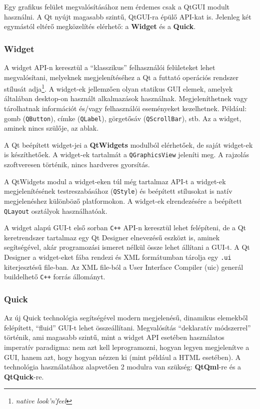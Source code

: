 \documentclass[12pt]{report}
\begin{document}
Egy grafikus felület megvalósításához nem érdemes csak a QtGUI modult használni. A Qt nyújt
magasabb szintű, QtGUI-ra épülő API-kat is. Jelenleg két egymástól eltérő megközelítés
elérhető: a \textbf{Widget} és a \textbf{Quick}.
\cite{bib:qt-doc-qt-gui, bib:qt-doc-user-interfaces}

\subsubsection{Widget}
A widget API-n keresztül a ``klasszikus'' felhasználói felületeket lehet megvalósítani,
melyeknek megjelenítéséhez a Qt a futtató operációs rendszer stílusát adja\footnote{
\textit{native look'n'feel}}. A widget-ek jellemzően olyan statikus GUI elemek, amelyek
általában desktop-on használt alkalmazások használnak. Megjeleníthetnek vagy tárolhatnak
információt és/vagy felhasználói eseményeket kezelhetnek. Például: gomb (\texttt{QButton}),
címke (\texttt{QLabel}), görgetősáv (\texttt{QScrollBar}), stb. Az a widget, aminek nincs
szülője, az ablak.
\cite{bib:qt-doc-qt-widgets}

A Qt beépített widget-jei a \textbf{QtWidgets} modulból elérhetőek, de saját widget-ek is
készíthetőek. A widget-ek tartalmát a \texttt{QGraphicsView} jeleníti meg. A rajzolás
szoftveresen történik, nincs hardveres gyorsítás.

A QtWidgets modul a widget-eken túl még tartalmaz API-t a widget-ek megjelenítésének
testreszabásához (\texttt{QStyle}) és beépített stílusokat is natív megjelenéshez különböző
platformokon. A widget-ek elrendezésére a beépített \texttt{QLayout} osztályok használhatóak.

A widget alapú GUI-t első sorban \texttt{C++} API-n keresztül lehet felépíteni, de a Qt
keretrendszer tartalmaz egy Qt Designer elnevezésű eszközt is, aminek segítségével,
akár programozási ismeret nélkül össze lehet állítani a GUI-t. A Qt Designer a widget-eket
fába rendezi és XML formátumban tárolja egy \texttt{.ui} kiterjesztésű file-ban. Az XML
file-ból a User Interface Compiler (uic) generál buildelhető \texttt{C++} forrás állományt.

\subsubsection{Quick}
Az új Quick technológia segítségével modern megjelenésű, dinamikus elemekből felépített,
``fluid'' GUI-t lehet összeállítani. Megvalósítás ``deklaratív módszerrel'' történik, ami
magasabb szintű, mint a widget API esetében használatos imperatív paradigma: nem azt kell
leprogramozni, hogyan legyen megjelenítve a GUI, hanem azt, hogy hogyan nézzen ki
(mint például a HTML esetében). A technológia használatához alapvetően 2 modulra van
szükség: \textbf{QtQml}-re és a \textbf{QtQuick}-re.
\end{document}
